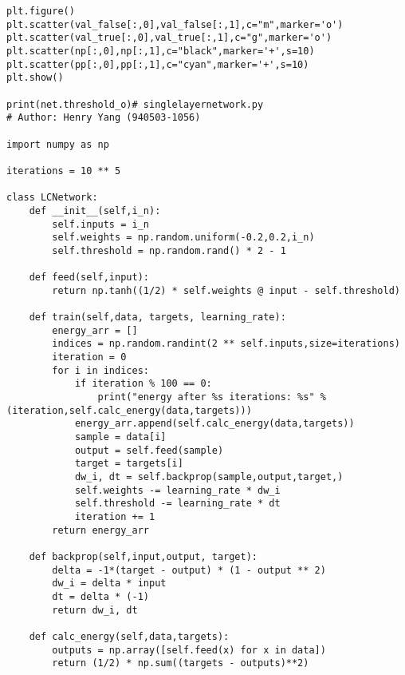 \begin{verbatim}
plt.figure()
plt.scatter(val_false[:,0],val_false[:,1],c="m",marker='o')
plt.scatter(val_true[:,0],val_true[:,1],c="g",marker='o')
plt.scatter(np[:,0],np[:,1],c="black",marker='+',s=10)
plt.scatter(pp[:,0],pp[:,1],c="cyan",marker='+',s=10)
plt.show()

print(net.threshold_o)# singlelayernetwork.py
# Author: Henry Yang (940503-1056)

import numpy as np

iterations = 10 ** 5

class LCNetwork:
    def __init__(self,i_n):
        self.inputs = i_n
        self.weights = np.random.uniform(-0.2,0.2,i_n)
        self.threshold = np.random.rand() * 2 - 1
    
    def feed(self,input):
        return np.tanh((1/2) * self.weights @ input - self.threshold)
    
    def train(self,data, targets, learning_rate):
        energy_arr = []
        indices = np.random.randint(2 ** self.inputs,size=iterations)
        iteration = 0
        for i in indices:
            if iteration % 100 == 0:
                print("energy after %s iterations: %s" % (iteration,self.calc_energy(data,targets)))
            energy_arr.append(self.calc_energy(data,targets))
            sample = data[i]
            output = self.feed(sample)
            target = targets[i]
            dw_i, dt = self.backprop(sample,output,target,)
            self.weights -= learning_rate * dw_i
            self.threshold -= learning_rate * dt
            iteration += 1
        return energy_arr

    def backprop(self,input,output, target):
        delta = -1*(target - output) * (1 - output ** 2)
        dw_i = delta * input
        dt = delta * (-1)
        return dw_i, dt
    
    def calc_energy(self,data,targets):
        outputs = np.array([self.feed(x) for x in data])
        return (1/2) * np.sum((targets - outputs)**2)

\end{verbatim}